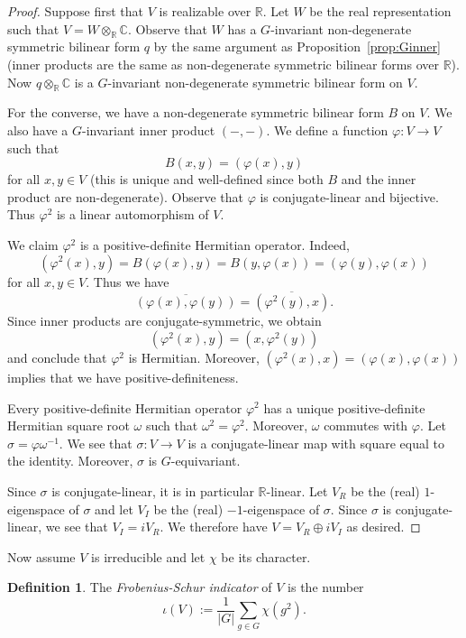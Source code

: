 \documentclass[12pt]{article}
\theoremstyle{plain}
\theoremstyle{definition}
\newtheorem{definition}[theorem]{Definition}
\theoremstyle{remark}
\numberwithin{equation}{section}
\begin{document}
\begin{proof}
Suppose first that $V$ is realizable over $\mathbb{R}$.
Let $W$ be the real representation such that $V = W \otimes_\mathbb{R}
\mathbb{C}$.  Observe that $W$ has a $G$-invariant non-degenerate symmetric bilinear
form $q$ by the same argument as Proposition~\ref{prop:Ginner}
(inner products are the same as non-degenerate symmetric bilinear
forms over $\mathbb{R}$).  Now $q \otimes_\mathbb{R} \mathbb{C}$
is a $G$-invariant non-degenerate symmetric bilinear form on $V$.

For the converse, we have a non-degenerate symmetric bilinear form $B$
on $V$.  We also have a $G$-invariant inner product $(-,-)$.
We define a function $\varphi : V \to V$ such that
\[
B(x,y)=(\varphi(x),y)
\]
for all $x,y \in V$
(this is unique and well-defined since both $B$ and the inner product
are non-degenerate).
Observe that $\varphi$ is conjugate-linear and bijective.
Thus $\varphi^2$ is a linear automorphism of $V$.

We claim $\varphi^2$ is a positive-definite Hermitian operator.
Indeed,
\[
(\varphi^2(x),y)=B(\varphi(x),y)=B(y,\varphi(x))=(\varphi(y),\varphi(x))
\]
for all $x,y \in V$.
Thus we have
\[
\overline{(\varphi(x),\varphi(y))}=\overline{(\varphi^2(y),x)}.
\]
Since inner products are conjugate-symmetric, we obtain
\[
(\varphi^2(x),y)=(x,\varphi^2(y))
\]
and conclude that $\varphi^2$ is Hermitian.
Moreover, $(\varphi^2(x),x)=(\varphi(x),\varphi(x))$
implies that we have positive-definiteness.

Every positive-definite Hermitian operator $\varphi^2$ has a unique
positive-definite Hermitian square root $\omega$ such that
$\omega^2=\varphi^2$.  Moreover, $\omega$ commutes with $\varphi$.
Let $\sigma = \varphi \omega^{-1}$.
We see that $\sigma : V \to V$ is a conjugate-linear map with square
equal to the identity.
Moreover, $\sigma$ is $G$-equivariant.

Since $\sigma$ is conjugate-linear, it is in particular
$\mathbb{R}$-linear. 
Let $V_R$ be the (real) $1$-eigenspace of $\sigma$ and let $V_I$ be the
(real) $-1$-eigenspace of $\sigma$.  Since $\sigma$ is conjugate-linear,
we see that $V_I=iV_R$.  We therefore have $V=V_R \oplus iV_I$
as desired.
\end{proof}

Now assume $V$ is irreducible and let $\chi$ be its character.

\begin{definition}
The \emph{Frobenius-Schur indicator} of $V$ is the number
\[
\iota(V) := \frac{1}{|G|}\sum_{g \in G} \chi(g^2).
\]
\end{definition}
\end{document}
